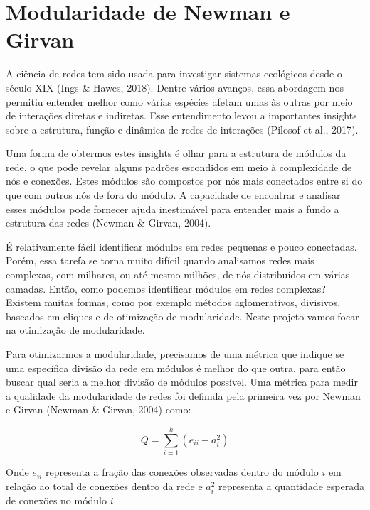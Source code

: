 \documentclass[
  12pt,
]{article}
\begin{document}
\pagebreak

\hypertarget{modularidade-de-newman-e-girvan}{%
\section{Modularidade de Newman e
Girvan}\label{modularidade-de-newman-e-girvan}}

A ciência de redes tem sido usada para investigar sistemas ecológicos
desde o século XIX (Ings \& Hawes, 2018). Dentre vários avanços, essa
abordagem nos permitiu entender melhor como várias espécies afetam umas
às outras por meio de interações diretas e indiretas. Esse entendimento
levou a importantes insights sobre a estrutura, função e dinâmica de
redes de interações (Pilosof et al., 2017).

Uma forma de obtermos estes insights é olhar para a estrutura de módulos
da rede, o que pode revelar alguns padrões escondidos em meio à
complexidade de nós e conexões. Estes módulos são compostos por nós mais
conectados entre si do que com outros nós de fora do módulo. A
capacidade de encontrar e analisar esses módulos pode fornecer ajuda
inestimável para entender mais a fundo a estrutura das redes (Newman \&
Girvan, 2004).

É relativamente fácil identificar módulos em redes pequenas e pouco
conectadas. Porém, essa tarefa se torna muito difícil quando analisamos
redes mais complexas, com milhares, ou até mesmo milhões, de nós
distribuídos em várias camadas. Então, como podemos identificar módulos
em redes complexas? Existem muitas formas, como por exemplo métodos
aglomerativos, divisivos, baseados em cliques e de otimização de
modularidade. Neste projeto vamos focar na otimização de modularidade.

Para otimizarmos a modularidade, precisamos de uma métrica que indique
se uma específica divisão da rede em módulos é melhor do que outra, para
então buscar qual seria a melhor divisão de módulos possível. Uma
métrica para medir a qualidade da modularidade de redes foi definida
pela primeira vez por Newman e Girvan (Newman \& Girvan, 2004) como:

\begin{equation} \label{eq:mod_basica}
    Q = \sum^{k}_{i=1}(e_{ii}-a^2_i)
\end{equation}

Onde \(e_{ii}\) representa a fração das conexões observadas dentro do
módulo \(i\) em relação ao total de conexões dentro da rede e \(a^2_i\)
representa a quantidade esperada de conexões no módulo \(i\).
\end{document}
